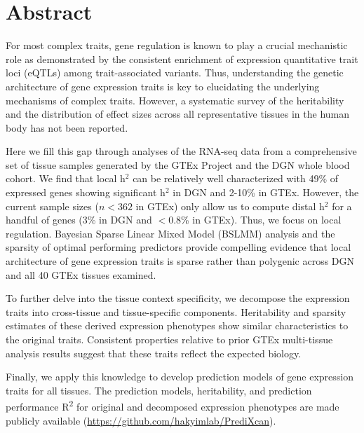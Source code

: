 \documentclass[10pt,letterpaper]{article}
\begin{document}
\section*{Abstract}
For most complex traits, gene regulation is known to play a crucial mechanistic role as demonstrated by the consistent enrichment of expression quantitative trait loci (eQTLs) among trait-associated variants. Thus, understanding the genetic architecture of gene expression traits is key to elucidating the underlying mechanisms of complex traits. However, a systematic survey of the heritability and the distribution of effect sizes across all representative tissues in the human body has not been reported.

Here we fill this gap through analyses of the RNA-seq data from a comprehensive set of tissue samples generated by the GTEx Project and the DGN whole blood cohort. We find that local h$^2$ can be relatively well characterized with 49\% of expressed genes showing significant h$^2$ in DGN and 2-10\% in GTEx. However, the current sample sizes ($n<362$ in GTEx) only allow us to compute distal h$^2$ for a handful of genes (3\% in DGN and $<$0.8\% in GTEx). Thus, we focus on local regulation. Bayesian Sparse Linear Mixed Model (BSLMM) analysis and the sparsity of optimal performing predictors provide compelling evidence that local architecture of gene expression traits is sparse rather than polygenic across DGN and all 40 GTEx tissues examined.

To further delve into the tissue context specificity, we decompose the expression traits into cross-tissue and tissue-specific components. Heritability and sparsity estimates of these derived expression phenotypes show similar characteristics to the original traits. Consistent properties relative to prior GTEx multi-tissue analysis results suggest that these traits reflect the expected biology.

Finally, we apply this knowledge to develop prediction models of gene expression traits for all tissues. The prediction models, heritability, and prediction performance R\textsuperscript{2} for original and decomposed expression phenotypes are made publicly available (\url{https://github.com/hakyimlab/PrediXcan}).


\end{document}
